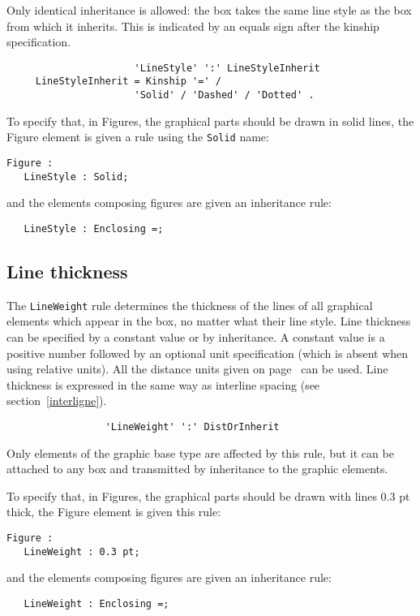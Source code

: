 Only identical inheritance is allowed: the box takes the same line
style as the box from which it inherits.  This is indicated by an
equals sign after the kinship specification.

\begin{verbatim}
                      'LineStyle' ':' LineStyleInherit
     LineStyleInherit = Kinship '=' /
                      'Solid' / 'Dashed' / 'Dotted' .
\end{verbatim}

\begin{example}
To specify that, in Figures, the graphical parts should be
drawn in solid lines, the Figure element is given a rule using the
{\tt Solid} name:

\begin{verbatim}
Figure :
   LineStyle : Solid;
\end{verbatim}
and the elements composing figures are given an inheritance rule:
\begin{verbatim}
   LineStyle : Enclosing =;
\end{verbatim}
\end{example}

\subsection{Line thickness}

The {\tt LineWeight} rule determines the thickness of the lines  of
all graphical elements which appear in the box, no matter what their
line style.  Line thickness can be specified by a constant value or by
inheritance.  A constant value is a positive number followed by an
optional unit specification (which is absent when using relative
units).  All the distance units given on page~\pageref{unites} can be
used.  Line thickness is expressed in the same way as interline
spacing (see section~\ref{interligne}).

\begin{verbatim}
                 'LineWeight' ':' DistOrInherit
\end{verbatim}

Only elements of the graphic base type are affected by this rule, but
it can be attached to any box and transmitted by inheritance to the
graphic elements.

\begin{example}
To specify that, in Figures, the graphical parts should be drawn with
lines 0.3 pt thick, the Figure element is given this rule:
\begin{verbatim}
Figure :
   LineWeight : 0.3 pt;
\end{verbatim}
and the elements composing figures are given an inheritance rule:
\begin{verbatim}
   LineWeight : Enclosing =;
\end{verbatim}
\end{example}

